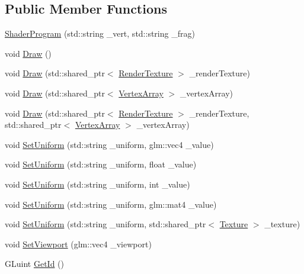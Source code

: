 \subsection*{Public Member Functions}
\begin{DoxyCompactItemize}
\item 
\mbox{\hyperlink{classharu_1_1_shader_program_acfb9528364468c5cbabb1f581643ae25}{Shader\+Program}} (std\+::string \+\_\+vert, std\+::string \+\_\+frag)
\item 
void \mbox{\hyperlink{classharu_1_1_shader_program_ab23193ba8426b49073e64646b7de6320}{Draw}} ()
\item 
void \mbox{\hyperlink{classharu_1_1_shader_program_a6e322ac38c9358486ccee3c06aef4de1}{Draw}} (std\+::shared\+\_\+ptr$<$ \mbox{\hyperlink{classharu_1_1_render_texture}{Render\+Texture}} $>$ \+\_\+render\+Texture)
\item 
void \mbox{\hyperlink{classharu_1_1_shader_program_af76596f322a345e67ad8ee1395cc76c4}{Draw}} (std\+::shared\+\_\+ptr$<$ \mbox{\hyperlink{classharu_1_1_vertex_array}{Vertex\+Array}} $>$ \+\_\+vertex\+Array)
\item 
void \mbox{\hyperlink{classharu_1_1_shader_program_af06e97b4b8eec4d8fd197f58df319206}{Draw}} (std\+::shared\+\_\+ptr$<$ \mbox{\hyperlink{classharu_1_1_render_texture}{Render\+Texture}} $>$ \+\_\+render\+Texture, std\+::shared\+\_\+ptr$<$ \mbox{\hyperlink{classharu_1_1_vertex_array}{Vertex\+Array}} $>$ \+\_\+vertex\+Array)
\item 
void \mbox{\hyperlink{classharu_1_1_shader_program_a558038555953abdd400d17b6af6a821b}{Set\+Uniform}} (std\+::string \+\_\+uniform, glm\+::vec4 \+\_\+value)
\item 
void \mbox{\hyperlink{classharu_1_1_shader_program_abd818797df7d006a1d8d2646653e576a}{Set\+Uniform}} (std\+::string \+\_\+uniform, float \+\_\+value)
\item 
void \mbox{\hyperlink{classharu_1_1_shader_program_a6cdbf2ff9c5bce4b7b1c039a1d9af142}{Set\+Uniform}} (std\+::string \+\_\+uniform, int \+\_\+value)
\item 
void \mbox{\hyperlink{classharu_1_1_shader_program_a9d36534e1ffd87f185da4b2bb7945723}{Set\+Uniform}} (std\+::string \+\_\+uniform, glm\+::mat4 \+\_\+value)
\item 
void \mbox{\hyperlink{classharu_1_1_shader_program_a9ea7128d64215e9e79076a0b36a69849}{Set\+Uniform}} (std\+::string \+\_\+uniform, std\+::shared\+\_\+ptr$<$ \mbox{\hyperlink{classharu_1_1_texture}{Texture}} $>$ \+\_\+texture)
\item 
void \mbox{\hyperlink{classharu_1_1_shader_program_a9534e78aa5537cf3e7f63a7c8d166ba7}{Set\+Viewport}} (glm\+::vec4 \+\_\+viewport)
\item 
G\+Luint \mbox{\hyperlink{classharu_1_1_shader_program_a6079bce91bd203b0915d974035701cfd}{Get\+Id}} ()
\end{DoxyCompactItemize}
